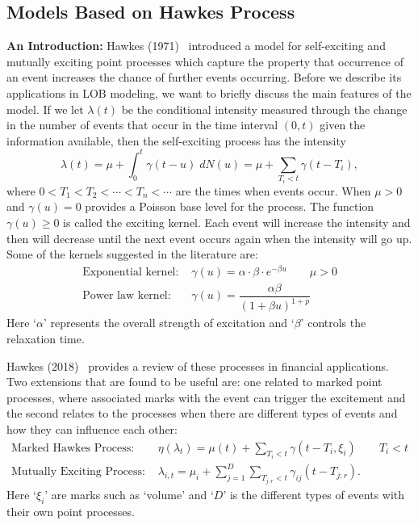 \subsection{Models Based on Hawkes Process}

\noindent\textbf{An Introduction:} Hawkes (1971)~\cite{hawkes71} introduced a model for self-exciting and mutually exciting point processes which capture the property that occurrence of an event increases the chance of further events occurring. Before we describe its applications in LOB modeling, we want to briefly discuss the main features of the model. If we let $\lambda(t)$ be the conditional intensity measured through the change in the number of events that occur in the time interval $(0,t)$ given the information available, then the self-exciting process has the intensity
	\begin{equation} \label{eq:seintensity}
	\lambda(t)= \mu + \int_0^t \gamma(t-u) \;dN(u)= \mu + \sum_{T_i<t} \gamma(t-T_i),
	\end{equation}
where $0<T_1<T_2<\cdots<T_n<\cdots$ are the times when events occur. When $\mu>0$ and $\gamma(u)=0$ provides a Poisson base level for the process. The function $\gamma(u) \geq 0$ is called the exciting kernel. Each event will increase the intensity and then will decrease until the next event occurs again when the intensity will go up. Some of the kernels suggested in the literature are:
	\begin{equation} \label{eq:suggex}
	\begin{split}
	\text{Exponential kernel: }& \gamma(u)= \alpha \cdot \beta \cdot e^{-\beta u} \quad\quad \mu>0 \\
	\text{Power law kernel: }& \gamma(u)= \dfrac{\alpha \beta}{(1+\beta u)^{1+p}}
	\end{split}
	\end{equation}
Here `$\alpha$' represents the overall strength of excitation and `$\beta$' controls the relaxation time. 


Hawkes (2018)~\cite{hawkes18} provides a review of these processes in financial applications. Two extensions that are found to be useful are: one related to marked point processes, where associated marks with the event can trigger the excitement and the second relates to the processes when there are different types of events and how they can influence each other:
	\begin{equation} \label{eq:markedhawk}
	\begin{split}
	\text{Marked Hawkes Process: }& \eta(\lambda_t)= \mu(t) + \sum_{T_i<t} \gamma(t-T_i, \xi_i) \quad \quad T_i<t \\
	\text{Mutually Exciting Process: }& \lambda_{i,t}= \mu_i + \sum_{j=1}^D \sum_{T_{j:r}<t} \gamma_{ij} (t- T_{j:r}).
	\end{split}
	\end{equation}
Here `$\xi_i$' are marks such as `volume' and `$D$' is the different types of events with their own point processes. \\


